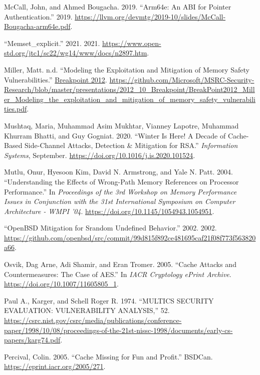 \documentclass[
  a4paper,
]{report}
\newlength{\cslhangindent}
\newenvironment{CSLReferences}[2] %
{\begin{list}{}{%
	\setlength{\itemindent}{0pt}
	\setlength{\leftmargin}{0pt}
	\setlength{\parsep}{0pt}
	\ifodd #1
	\setlength{\leftmargin}{\cslhangindent}
	\setlength{\itemindent}{-1\cslhangindent}
	\fi
	\setlength{\itemsep}{#2\baselineskip}}}
{\end{list}}
\begin{document}
\begin{CSLReferences}{1}{0}
McCall, John, and Ahmed Bougacha. 2019. {``Arm64e: An ABI for Pointer
Authentication.''} 2019.
\url{https://llvm.org/devmtg/2019-10/slides/McCall-Bougacha-arm64e.pdf}.

{``Memset\_explicit.''} 2021. 2021.
\url{https://www.open-std.org/jtc1/sc22/wg14/www/docs/n2897.htm}.

Miller, Matt. n.d. {``Modeling the Exploitation and Mitigation of Memory
Safety Vulnerabilities.''}
\href{https://2012.ruxconbreakpoint.com/}{Breakpoint 2012}.
\url{https://github.com/Microsoft/MSRC-Security-Research/blob/master/presentations/2012_10_Breakpoint/BreakPoint2012_Miller_Modeling_the_exploitation_and_mitigation_of_memory_safety_vulnerabilities.pdf}.

Mushtaq, Maria, Muhammad Asim Mukhtar, Vianney Lapotre, Muhammad Khurram
Bhatti, and Guy Gogniat. 2020. {``Winter Is Here! A Decade of
Cache-Based Side-Channel Attacks, Detection \& Mitigation for {RSA}.''}
\emph{Information Systems}, September.
\url{https://doi.org/10.1016/j.is.2020.101524}.

Mutlu, Onur, Hyesoon Kim, David N. Armstrong, and Yale N. Patt. 2004.
{``Understanding the Effects of Wrong-Path Memory References on
Processor Performance.''} In \emph{Proceedings of the 3rd Workshop on
Memory Performance Issues in Conjunction with the 31st International
Symposium on Computer Architecture - WMPI '04}.
\url{https://doi.org/10.1145/1054943.1054951}.

{``OpenBSD Mitigation for Srandom Undefined Behavior.''} 2002. 2002.
\url{https://github.com/openbsd/src/commit/99d815f892ce481695caf21f08f773f563820a66}.

Osvik, Dag Arne, Adi Shamir, and Eran Tromer. 2005. {``Cache Attacks and
Countermeasures: The Case of AES.''} In \emph{IACR Cryptology ePrint
Archive}. \url{https://doi.org/10.1007/11605805_1}.

Paul A., Karger, and Schell Roger R. 1974. {``MULTICS SECURITY
EVALUATION: VULNERABILITY ANALYSIS,''} 52.
\url{https://csrc.nist.gov/csrc/media/publications/conference-paper/1998/10/08/proceedings-of-the-21st-nissc-1998/documents/early-cs-papers/karg74.pdf}.

Percival, Colin. 2005. {``Cache Missing for Fun and Profit.''} BSDCan.
\url{https://eprint.iacr.org/2005/271}.


\end{CSLReferences}
\end{document}
